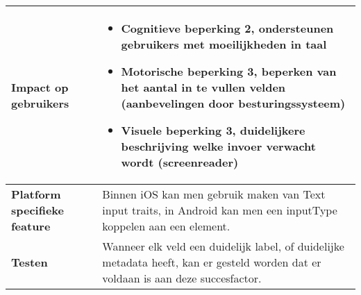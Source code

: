 \begin{table}[H]
\begin{tabular}{|l|p{12cm}|}
        \hline
        \textbf{Impact op gebruikers}         &  
        \begin{itemize}
            \item Cognitieve beperking 2, ondersteunen gebruikers met moeilijkheden in taal
            \item Motorische beperking 3, beperken van het aantal in te vullen velden (aanbevelingen door besturingssysteem)
            \item Visuele beperking 3, duidelijkere beschrijving welke invoer verwacht wordt (screenreader)
        \end{itemize}                                                                                                                                                                                                                                                                                                                                                                                                                    \\ 
        \hline
        \textbf{Platform specifieke feature}  & Binnen iOS kan men gebruik maken van Text input traits, in Android kan men een inputType koppelen aan een element.                                                                                                                                                                                                                                                                                                      \\ 
        \hline
        \textbf{Testen}                       & Wanneer elk veld een duidelijk label, of duidelijke metadata heeft, kan er gesteld worden dat er voldaan is aan deze succesfactor.                                                                                                                                                                                                                                                                                                                 \\
        \hline
    \end{tabular}
\end{table}

